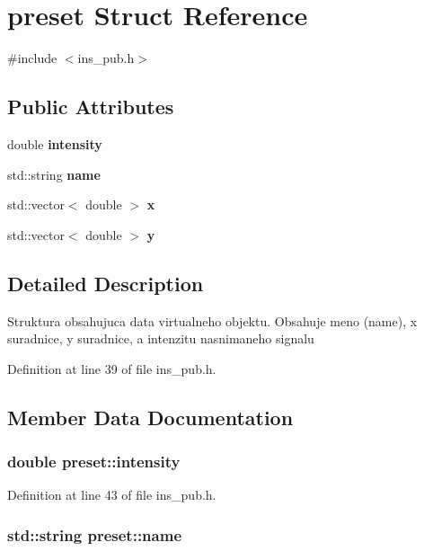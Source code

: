 \section{preset Struct Reference}
\label{structpreset}


{\ttfamily \#include $<$ins\_\-pub.h$>$}

\subsection*{Public Attributes}
\begin{DoxyCompactItemize}
\item 
double {\bf intensity}
\item 
std::string {\bf name}
\item 
std::vector$<$ double $>$ {\bf x}
\item 
std::vector$<$ double $>$ {\bf y}
\end{DoxyCompactItemize}


\subsection{Detailed Description}
Struktura obsahujuca data virtualneho objektu. Obsahuje meno (name), x suradnice, y suradnice, a intenzitu nasnimaneho signalu 

Definition at line 39 of file ins\_\-pub.h.



\subsection{Member Data Documentation}
\subsubsection[{intensity}]{\setlength{\rightskip}{0pt plus 5cm}double {\bf preset::intensity}}\label{structpreset_a330b993ee3a0368dc4b37aaf7403283f}


Definition at line 43 of file ins\_\-pub.h.

\subsubsection[{name}]{\setlength{\rightskip}{0pt plus 5cm}std::string {\bf preset::name}}\label{structpreset_a044c1137ae514926bd680565d3fee755}


